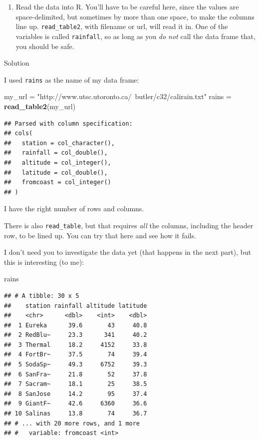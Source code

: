 \documentclass[]{tufte-book}
\newenvironment{Shaded}{}{}
\newcommand{\KeywordTok}[1]{\textcolor[rgb]{0.00,0.44,0.13}{\textbf{#1}}}
\newcommand{\NormalTok}[1]{#1}
\newcommand{\StringTok}[1]{\textcolor[rgb]{0.25,0.44,0.63}{#1}}
\providecommand{\tightlist}{%
  \setlength{\itemsep}{0pt}\setlength{\parskip}{0pt}}
\theoremstyle{definition}
\theoremstyle{definition}
\theoremstyle{definition}
\theoremstyle{remark}
\begin{document}
\begin{enumerate}
\def\labelenumi{(\alph{enumi})}
\tightlist
\item
  Read the data into R. You'll have to be careful here, since the values
  are space-delimited, but sometimes by more than one space, to make the
  columns line up. \texttt{read\_table2}, with filename or url, will
  read it in. One of the variables is called \texttt{rainfall}, so as
  long as you \emph{do not} call the data frame that, you should be
  safe.
\end{enumerate}

Solution

I used \texttt{rains} as the name of my data frame:

\begin{Shaded}
\begin{Highlighting}[]
\NormalTok{my_url =}\StringTok{ "http://www.utsc.utoronto.ca/~butler/c32/calirain.txt"}
\NormalTok{rains =}\StringTok{ }\KeywordTok{read_table2}\NormalTok{(my_url)}
\end{Highlighting}
\end{Shaded}

\begin{verbatim}
## Parsed with column specification:
## cols(
##   station = col_character(),
##   rainfall = col_double(),
##   altitude = col_integer(),
##   latitude = col_double(),
##   fromcoast = col_integer()
## )
\end{verbatim}

I have the right number of rows and columns.

There is also \texttt{read\_table}, but that requires \emph{all} the
columns, including the header row, to be lined up. You can try that here
and see how it fails.

I don't need you to investigate the data yet (that happens in the next
part), but this is interesting (to me):

\begin{Shaded}
\begin{Highlighting}[]
\NormalTok{rains}
\end{Highlighting}
\end{Shaded}

\begin{verbatim}
## # A tibble: 30 x 5
##    station rainfall altitude latitude
##    <chr>      <dbl>    <int>    <dbl>
##  1 Eureka      39.6       43     40.8
##  2 RedBlu~     23.3      341     40.2
##  3 Thermal     18.2     4152     33.8
##  4 FortBr~     37.5       74     39.4
##  5 SodaSp~     49.3     6752     39.3
##  6 SanFra~     21.8       52     37.8
##  7 Sacram~     18.1       25     38.5
##  8 SanJose     14.2       95     37.4
##  9 GiantF~     42.6     6360     36.6
## 10 Salinas     13.8       74     36.7
## # ... with 20 more rows, and 1 more
## #   variable: fromcoast <int>
\end{verbatim}
\end{document}
